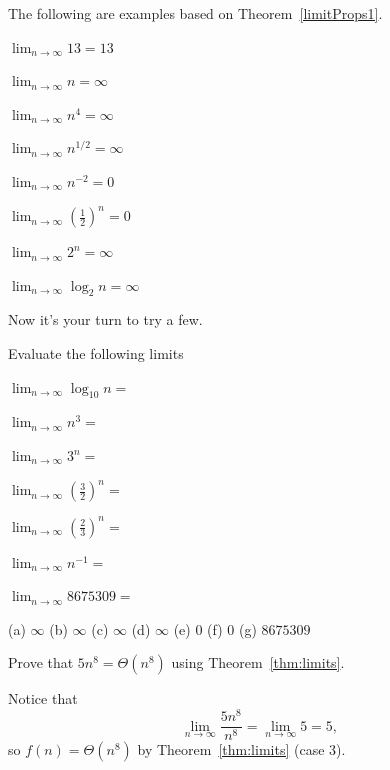 \begin{exa}
The following are examples based on Theorem~\ref{limitProps1}.
\begin{lenum}
\item
$\displaystyle\lim_{n\rightarrow\infty} 13 = 13$
\item
$\displaystyle\lim_{n\rightarrow\infty} n = \infty$
\item
$\displaystyle\lim_{n\rightarrow\infty} n^4 = \infty$
\item
$\displaystyle\lim_{n\rightarrow\infty} n^{1/2} = \infty$
\item
$\displaystyle\lim_{n\rightarrow\infty} n^{-2} = 0$
\item
$\displaystyle\lim_{n\rightarrow\infty} \left(\frac{1}{2}\right)^{n} = 0$
\item
$\displaystyle\lim_{n\rightarrow\infty} 2^{n} = \infty$
\item
$\displaystyle\lim_{n\rightarrow\infty} \log_2 n = \infty$
\end{lenum}
\end{exa}
 
Now it's your turn to try a few.
 
\begin{exer}
Evaluate the following limits
\begin{lenum}
  \setlength{\itemsep}{.25in}
\item
$\displaystyle\lim_{n\rightarrow\infty} \log_{10} n =$
\item
$\displaystyle\lim_{n\rightarrow\infty} n^3 =$
\item
$\displaystyle\lim_{n\rightarrow\infty} 3^n =$
\item
$\displaystyle\lim_{n\rightarrow\infty} \left(\frac{3}{2}\right)^n =$
\item
$\displaystyle\lim_{n\rightarrow\infty} \left(\frac{2}{3}\right)^n =$
\item
$\displaystyle\lim_{n\rightarrow\infty} n^{-1} =$
\item
$\displaystyle\lim_{n\rightarrow\infty} 8675309 =$
\end{lenum}
\begin{answer}
(a) $\infty$ 
(b) $\infty$ 
(c) $\infty$ 
(d) $\infty$ 
(e) $0$
(f) $0$
(g) $8675309$
\end{answer}
\end{exer}
 
\begin{exa}
Prove that  $5n^8=\Theta(n^8)$ using Theorem~\ref{thm:limits}.
\begin{sol}
Notice that 
$$\lim_{n\rightarrow\infty}\frac{5n^8}{n^8}= \lim_{n\rightarrow\infty}5=5,$$
so $f(n)=\Theta(n^8)$ by Theorem~\ref{thm:limits} (case 3).
\end{sol}
\end{exa}
 
